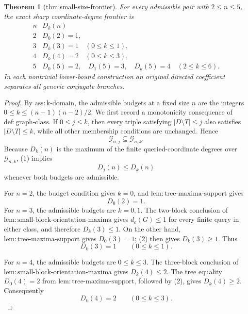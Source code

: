 \documentclass{article}
\newtheorem{theorem}{Theorem}
\begin{document}
\begin{theorem}[thm:small-size-frontier]\label{thm:small-size-frontier}
For every admissible pair with \(2\leq n\leq5\), the exact sharp coordinate-degree frontier is
\[
\begin{array}{c|c}
 n & D_k(n)\\ \hline
 2 & D_0(2)=1,\\
 3 & D_k(3)=1\quad(0\leq k\leq1),\\
 4 & D_k(4)=2\quad(0\leq k\leq3),\\
 5 & D_0(5)=2,\quad D_1(5)=3,\quad D_k(5)=4\quad(2\leq k\leq6).
\end{array}
\]
In each nontrivial lower-bound construction an original directed coefficient separates all generic conjugate branches.
\end{theorem}
\begin{proof}
By \(\mathrm{ass:k\mbox{-}domain}\), the admissible budgets at a fixed size \(n\) are the integers \(0\leq k\leq (n-1)(n-2)/2\).  We first record a monotonicity consequence of \(\mathrm{def:graph\mbox{-}class}\).  If \(0\leq j\leq k\), then every triple satisfying \(|D\setminus T|\leq j\) also satisfies \(|D\setminus T|\leq k\), while all other membership conditions are unchanged.  Hence
\[
 \mathcal G_{n,j}\subseteq\mathcal G_{n,k}.
\tag{1}
\]
Because \(D_k(n)\) is the maximum of the finite queried-coordinate degrees over \(\mathcal G_{n,k}\), (1) implies
\[
 D_j(n)\leq D_k(n)
\tag{2}
\]
whenever both budgets are admissible.

For \(n=2\), the budget condition gives \(k=0\), and \(\mathrm{lem:tree\mbox{-}maxima\mbox{-}support}\) gives
\[
 D_0(2)=1.
\tag{3}
\]
For \(n=3\), the admissible budgets are \(k=0,1\).  The two-block conclusion of \(\mathrm{lem:small\mbox{-}block\mbox{-}orientation\mbox{-}maxima}\) gives \(d_e(G)\leq1\) for every finite query in either class, and therefore \(D_k(3)\leq1\).  On the other hand, \(\mathrm{lem:tree\mbox{-}maxima\mbox{-}support}\) gives \(D_0(3)=1\); (2) then gives \(D_k(3)\geq1\).  Thus
\[
 D_k(3)=1\qquad(0\leq k\leq1).
\tag{4}
\]

For \(n=4\), the admissible budgets are \(0\leq k\leq3\).  The three-block conclusion of \(\mathrm{lem:small\mbox{-}block\mbox{-}orientation\mbox{-}maxima}\) gives \(D_k(4)\leq2\).  The tree equality \(D_0(4)=2\) from \(\mathrm{lem:tree\mbox{-}maxima\mbox{-}support}\), followed by (2), gives \(D_k(4)\geq2\).  Consequently
\[
 D_k(4)=2\qquad(0\leq k\leq3).
\tag{5}
\]


\end{proof}
\end{document}
